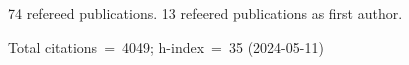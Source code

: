 74 refereed publications. 13 refeered publications as first author.

Total citations~=~4049; h-index~=~35 (2024-05-11)
